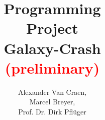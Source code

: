 \documentclass[aspectratio=169,table,x11names,dvipsnames]{beamer}
\institute[logo=.logos/ipvslogo_rund_blau_dunkel.pdf, url=https://www.ipvs.uni-stuttgart.de/]{Institute for Parallel and Distributed Systems}{IPVS}
\title{Programming\\ Project\\ Galaxy-Crash\\ \textcolor{red}{(preliminary)}}
\author[Van Craen, Breyer, Prof. Pflüger]{Alexander Van Craen,\\Marcel Breyer,\\Prof. Dr. Dirk Pflüger}
\date{\semester}
\begin{document}
  \titleslide

  
\end{document}
